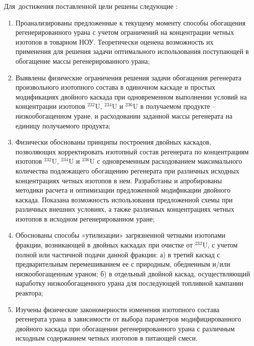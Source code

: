 Для~достижения поставленной цели решены следующие {\tasks}:
\begin{enumerate}
  \item Проанализированы предложенные к текущему моменту способы обогащения регенерированного урана с учетом ограничений на концентрации четных изотопов в товарном НОУ. Теоретически оценена возможность их применения для решения задачи оптимального использования поступающей в обогащение массы регенерированного урана;
  \item Выявлены физические ограничения решения задачи обогащения регенерата произвольного изотопного состава в одиночном каскаде и простых модификациях двойного каскада при одновременном выполнении условий на концентрации изотопов $^{232}$U, $^{234}$U и $^{236}$U в получаемом продукте -- низкообогащенном уране, и расходовании заданной массы регенерата на единицу получаемого продукта;
  \item Физически обоснованы принципы построения двойных каскадов, позволяющих корректировать изотопный состав регенерата по концентрациям изотопов $^{232}$U, $^{234}$U и $^{236}$U с одновременным расходованием максимального количества подлежащего обогащению регенерата при различных исходных концентрациях четных изотопов в нем. Разработаны и апробированы методики расчета и оптимизации предложенной модификации двойного каскада. Показана возможность использования предложенной схемы при различных внешних условиях, а также различных концентрациях четных изотопов в исходном регенерированном уране;
  \item Обоснованы способы «утилизации» загрязненной четными изотопами фракции, возникающей в двойных каскадах при очистке от $^{232}$U, с учетом полной или частичной подачи данной фракции: а) в третий каскад с предварительным
  перемешиванием ее с природным, обедненным и/или низкообогащенным ураном; б) в отдельный двойной каскад, осуществляющий наработку низкообогащенного урана для последующей топливной кампании реактора;
  \item Изучены физические закономерности изменения изотопного состава регенерата урана в зависимости от выбора параметров модифицированного двойного каскада при обогащении регенерированного урана с различным исходным содержанием четных изотопов в питающей смеси.
\end{enumerate}

